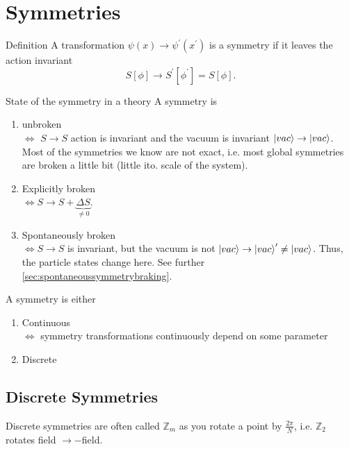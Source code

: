 \section{Symmetries}
\begin{mybox}{Definition}
A transformation $\psi(x) \rightarrow \psi^\prime (x^\prime)$ is a symmetry if it leaves the action invariant
\begin{equation}
	S[\phi] \rightarrow S^\prime [\phi^\prime] = S[\phi].
\end{equation}
\end{mybox}
\begin{mybox}{State of the symmetry in a theory}
	A symmetry is
	\begin{enumerate}
		\item unbroken \\$\Leftrightarrow$ $S\rightarrow S$ action is invariant and the vacuum is invariant $\ket{vac}\rightarrow\ket{vac}$.\\
		Most of the symmetries we know are not exact, i.e. most global symmetries are broken a little bit (little ito. scale of the system).
		\item Explicitly broken \\$\Leftrightarrow S\rightarrow S+\underbrace{\Delta S}_{\neq 0}$.
		\item Spontaneously broken\\
		$\Leftrightarrow S\rightarrow S$ is invariant, but the vacuum is not $\ket{vac}\rightarrow \ket{vac}^\prime \neq  \ket{vac}$. Thus, the particle states change here. See further \ref{sec:spontaneoussymmetrybraking}.
	\end{enumerate}
\end{mybox}
A symmetry is either
\begin{enumerate}
	\item Continuous \\
	$\Leftrightarrow$ symmetry transformations continuously depend on some parameter
	\item Discrete
\end{enumerate}
\subsection{Discrete Symmetries}
Discrete symmetries are often called $\mathbb{Z}_m$ as you rotate a point by $\frac{2 \pi}{N}$, i.e. $\mathbb{Z}_2$ rotates field $\rightarrow-$field.
